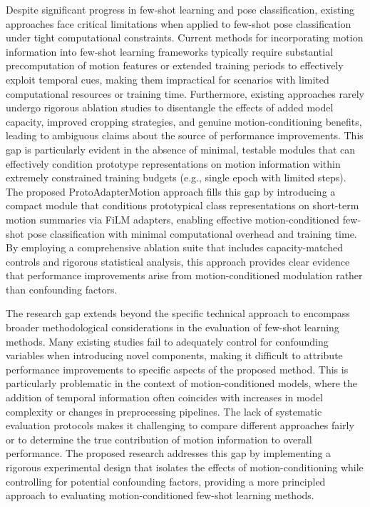 \documentclass[11pt]{article}
\begin{document}
Despite significant progress in few-shot learning and pose classification, existing approaches face critical limitations when applied to few-shot pose classification under tight computational constraints. Current methods for incorporating motion information into few-shot learning frameworks typically require substantial precomputation of motion features or extended training periods to effectively exploit temporal cues, making them impractical for scenarios with limited computational resources or training time. Furthermore, existing approaches rarely undergo rigorous ablation studies to disentangle the effects of added model capacity, improved cropping strategies, and genuine motion-conditioning benefits, leading to ambiguous claims about the source of performance improvements. This gap is particularly evident in the absence of minimal, testable modules that can effectively condition prototype representations on motion information within extremely constrained training budgets (e.g., single epoch with limited steps). The proposed ProtoAdapterMotion approach fills this gap by introducing a compact module that conditions prototypical class representations on short-term motion summaries via FiLM adapters, enabling effective motion-conditioned few-shot pose classification with minimal computational overhead and training time. By employing a comprehensive ablation suite that includes capacity-matched controls and rigorous statistical analysis, this approach provides clear evidence that performance improvements arise from motion-conditioned modulation rather than confounding factors.

The research gap extends beyond the specific technical approach to encompass broader methodological considerations in the evaluation of few-shot learning methods. Many existing studies fail to adequately control for confounding variables when introducing novel components, making it difficult to attribute performance improvements to specific aspects of the proposed method. This is particularly problematic in the context of motion-conditioned models, where the addition of temporal information often coincides with increases in model complexity or changes in preprocessing pipelines. The lack of systematic evaluation protocols makes it challenging to compare different approaches fairly or to determine the true contribution of motion information to overall performance. The proposed research addresses this gap by implementing a rigorous experimental design that isolates the effects of motion-conditioning while controlling for potential confounding factors, providing a more principled approach to evaluating motion-conditioned few-shot learning methods.
\end{document}
